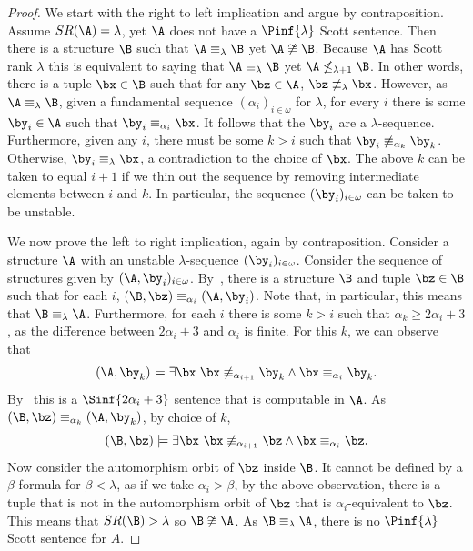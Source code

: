 \documentclass{amsart}
\newcommand{\SR}{SR}
\begin{document}
\begin{proof}
We start with the right to left implication and argue by contraposition. Assume
$\SR(\A)=\lambda$, yet $\A$ does not have a $\Pinf{\lambda}$ Scott sentence.
Then there is a structure $\B$ such that $\A\equiv_\lambda \B$ yet $\A\not\cong
\B$. Because $\A$ has Scott rank $\lambda$ this is equivalent to saying that
$\A\equiv_\lambda \B$ yet $\A\not\leq_{\lambda+1} \B$. In other words, there is
a tuple $\bx\in \B$ such that for any $\bz\in \A$, $\bz\not\equiv_\lambda \bx$.
However, as $\A\equiv_\lambda \B$, given a fundamental sequence
$(\alpha_i)_{i\in\omega}$ for $\lambda$, for every $i$ there is some $\by_i\in \A$ such that
$\by_i\equiv_{\alpha_i} \bx$. It follows that the $\by_i$ are a
$\lambda$-sequence. Furthermore, given any $i$, there must be some $k>i$ such
that $\by_i\not\equiv_{\alpha_{k}}\by_{k}$. Otherwise, $\by_i\equiv_\lambda \bx$,
a contradiction to the choice of $\bx$. The above $k$ can be taken to equal
$i+1$ if we thin out the sequence by removing intermediate elements between $i$
and $k$. In particular, the sequence $(\by_i)_{i\in\omega}$ can be taken to be unstable.

We now prove the left to right implication, again by contraposition. Consider a
structure $\A$ with an unstable $\lambda$-sequence $(\by_i)_{i\in\omega}$. Consider the sequence of
structures given by $(\A,\by_i)_{i\in\omega}$. By~\cite[Lemma
XII.6]{montalban2021a}, there is a structure $\B$ and tuple $\bz\in \B$ such
that for each $i$, $(\B,\bz)\equiv_{\alpha_i}(\A,\by_i)$. Note that, in
particular, this means that $\B\equiv_\lambda \A$. Furthermore, for each $i$
there is some $k>i$ such that $\alpha_k\geq 2\alpha_i+3$, as the difference
between $2\alpha_i+3$ and $\alpha_i$ is finite. For this $k$, we can observe that 
\[(\A,\by_k)\models \exists \bx \ \bx\not\equiv_{\alpha_{i+1}} \by_k \land
\bx\equiv_{\alpha_i} \by_k.\]
By~\cite[Lemma VI.14]{montalban2021a} this is a
$\Sinf{2\alpha_i+3}$ sentence that is computable in $\A$. As
$(\B,\bz)\equiv_{\alpha_k}(\A,\by_k)$, by choice of $k$,
\[(\B,\bz)\models \exists \bx ~ \bx\not\equiv_{\alpha_{i+1}} \bz \land
\bx\equiv_{\alpha_i} \bz.\]
Now consider the automorphism orbit of $\bz$ inside $\B$. It cannot be defined
by a $\beta$ formula for $\beta<\lambda$, as if we take $\alpha_i>\beta$, by the
above observation, there is a tuple that is not in the automorphism orbit of
$\bz$ that is $\alpha_i$-equivalent to $\bz$. This means that $SR(\B)>\lambda$ so
$\B\not\cong \A$. As $\B\equiv_\lambda \A$, there is no $\Pinf{\lambda}$ Scott sentence for $A$.
\end{proof}
\end{document}
